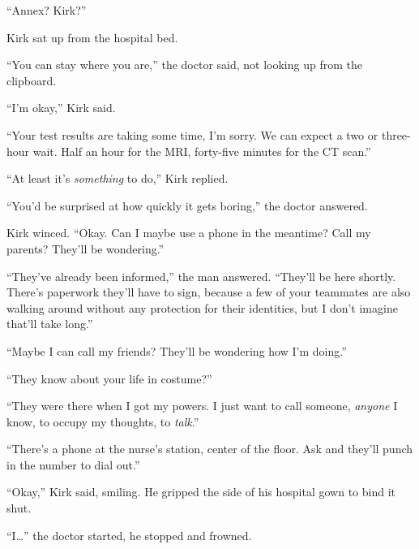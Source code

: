 \blacksquare



``Annex?  Kirk?''



Kirk sat up from the hospital bed.



``You can stay where you are,'' the doctor said, not looking up from the clipboard.



``I'm okay,'' Kirk said.



``Your test results are taking some time, I'm sorry.  We can expect a two or three-hour wait.  Half an hour for the MRI, forty-five minutes for the CT scan.''



``At least it's \emph{something} to do,'' Kirk replied.



``You'd be surprised at how quickly it gets boring,'' the doctor answered.



Kirk winced.  ``Okay.  Can I maybe use a phone in the meantime?  Call my parents?  They'll be wondering.''



``They've already been informed,'' the man answered.  ``They'll be here shortly.  There's paperwork they'll have to sign, because a few of your teammates are also walking around without any protection for their identities, but I don't imagine that'll take long.''



``Maybe I can call my friends?  They'll be wondering how I'm doing.''



``They know about your life in costume?''



``They were there when I got my powers.  I just want to call someone, \emph{anyone} I know, to occupy my thoughts, to \emph{talk}.''



``There's a phone at the nurse's station, center of the floor.  Ask and they'll punch in the number to dial out.''



``Okay,'' Kirk said, smiling.  He gripped the side of his hospital gown to bind it shut.



``I\ldots'' the doctor started, he stopped and frowned.



